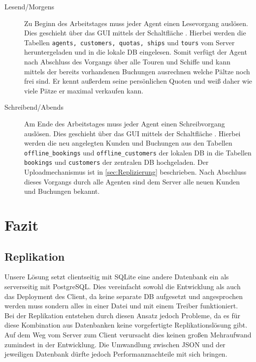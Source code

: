 \documentclass[12pt,a4paper,ngerman,english]{report}
\begin{document}
\begin{description}
\item[Lesend/Morgens] Zu Beginn des Arbeitstages muss jeder Agent einen Lesevorgang auslösen. Dies geschieht über das GUI mittels der Schaltfläche . Hierbei werden die Tabellen \texttt{agents, customers, quotas, ships} und \texttt{tours} vom Server heruntergeladen und in die lokale DB eingelesen. Somit verfügt der Agent nach Abschluss des Vorgangs über alle Touren und Schiffe und kann mittels der bereits vorhandenen Buchungen ausrechnen welche Pältze noch frei sind. Er kennt außerdem seine persönlichen Quoten und weiß daher wie viele Pätze er maximal verkaufen kann.
\item[Schreibend/Abends] Am Ende des Arbeitstages muss jeder Agent einen Schreibvorgang auslösen. Dies geschieht über das GUI mittels der Schaltfläche . Hierbei werden die neu angelegten Kunden und Buchungen aus den Tabellen \texttt{offline\_bookings} und \texttt{offline\_customers} der lokalen DB in die Tabellen \texttt{bookings} und \texttt{customers} der zentralen DB hochgeladen. Der Uploadmechanismus ist in \autoref{sec:Replizierung} beschrieben. Nach Abschluss dieses Vorgangs durch alle Agenten sind dem Server alle neuen Kunden und Buchungen bekannt. 
\end{description}

\chapter{Fazit}

\section{Replikation}
\label{sec:FazitRepl}

Unsere Lösung setzt clientseitig mit SQLite eine andere Datenbank ein als serverseitig mit PostgreSQL. Dies vereinfacht sowohl die Entwicklung als auch das Deployment des Client, da keine separate DB aufgesetzt und angesprochen werden muss sondern alles in einer Datei und mit einem Treiber funktioniert.\\

Bei der Replikation entstehen durch diesen Ansatz jedoch Probleme, da es für diese Kombination aus Datenbanken keine vorgefertigte Replikationslösung gibt. Auf dem Weg vom Server zum Client verursacht dies keinen großen Mehraufwand zumindest in der Entwicklung. Die Umwandlung zwischen JSON und der jeweiligen Datenbank dürfte jedoch Performanznachteile mit sich bringen.
\end{document}
